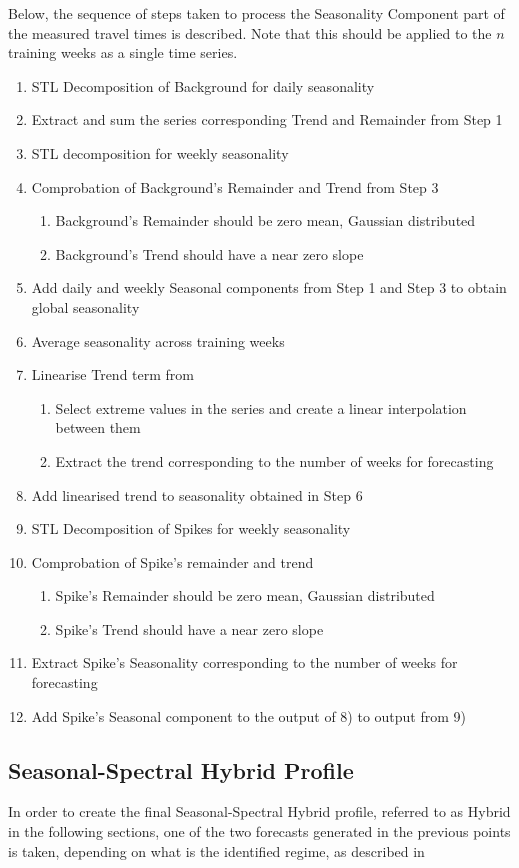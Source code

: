 \documentclass[conference]{IEEEtran}
\begin{document}
Below, the sequence of steps taken to process the Seasonality Component part of the measured travel times is described. 
Note that this should be applied to the $n$ training weeks as a single time series.
\begin{enumerate}
	\item STL Decomposition of Background for daily seasonality
	\item Extract and sum the series corresponding Trend and Remainder from Step 1
	\item STL decomposition for weekly seasonality
	\item Comprobation of Background's Remainder and Trend from Step 3
	\begin{enumerate}
		\item Background's Remainder should be zero mean, Gaussian distributed
		\item Background's Trend should have a near zero slope
	\end{enumerate}
	\item Add daily and weekly Seasonal components from Step 1 and Step 3 to obtain global seasonality
	\item Average seasonality across training weeks
	\item Linearise Trend term from
	\begin{enumerate}
		\item Select extreme values in the series and create a linear interpolation between them
		\item Extract the trend corresponding to the number of weeks for forecasting
	\end{enumerate}
	\item Add linearised trend to seasonality obtained in Step 6
	\item STL Decomposition of Spikes for weekly seasonality
	\item Comprobation of Spike's remainder and trend
	\begin{enumerate}
		\item Spike's Remainder should be zero mean, Gaussian distributed
		\item Spike's Trend should have a near zero slope
	\end{enumerate}
	\item Extract Spike's Seasonality corresponding to the number of weeks for forecasting
	\item Add Spike's Seasonal component to the output of 8) to output from 9)
\end{enumerate}
\subsection{Seasonal-Spectral Hybrid Profile}
In order to create the final Seasonal-Spectral Hybrid profile, referred to as Hybrid in the following sections, one of the two forecasts generated in the previous points is taken, depending on what is the identified regime, as described in 
\end{document}
